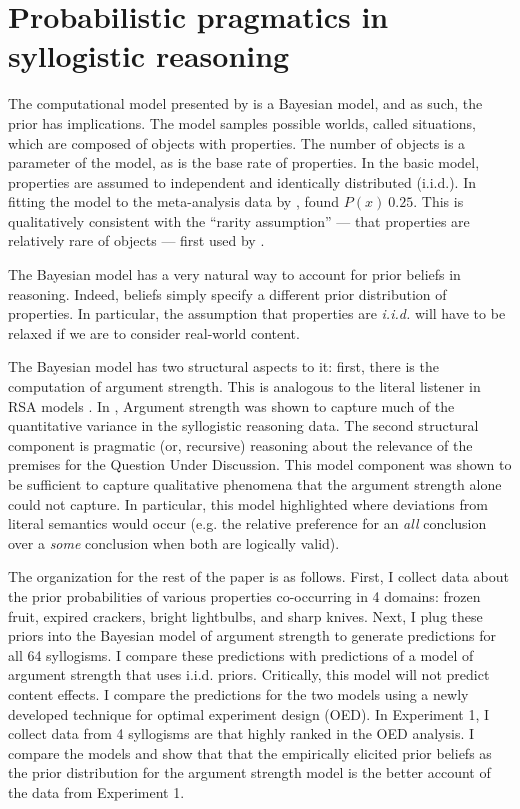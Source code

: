 \documentclass{llncs} %
\begin{document}
\section{Probabilistic pragmatics in syllogistic reasoning}

The computational model presented by  is a Bayesian model, and as such, the prior has implications. The model samples possible worlds, called situations, which are composed of objects with properties. The number of objects is a parameter of the model, as is the base rate of properties. In the basic model, properties are assumed to independent and identically distributed (i.i.d.). In fitting the model to the meta-analysis data by ,  found $P(x) ~ 0.25$. This is qualitatively consistent with the ``rarity assumption'' --- that properties are relatively rare of objects --- first used by .

The Bayesian model has a very natural way to account for prior beliefs in reasoning. Indeed, beliefs simply specify a different prior distribution of properties. In particular, the assumption that properties are \emph{i.i.d.} will have to be relaxed if we are to consider real-world content.

The Bayesian model has two structural aspects to it: first, there is the computation of argument strength. This is analogous to the literal listener in RSA models \cite{Frank2012; Goodman2013}. In \cite{Tessler2014}, Argument strength was shown to capture much of the quantitative variance in the syllogistic reasoning data. The second structural component is pragmatic (or, recursive) reasoning about the relevance of the premises for the Question Under Discussion. This model component was shown to be sufficient to capture qualitative phenomena that the argument strength alone could not capture. In particular, this model highlighted where deviations from literal semantics would occur (e.g. the relative preference for an \emph{all} conclusion over a \emph{some} conclusion when both are logically valid). 

The organization for the rest of the paper is as follows. First, I collect data about the prior probabilities of various properties co-occurring in 4 domains: frozen fruit, expired crackers, bright lightbulbs, and sharp knives. Next, I plug these priors into the Bayesian model of argument strength to generate predictions for all 64 syllogisms. I compare these predictions with predictions of a model of argument strength that uses i.i.d. priors. Critically, this model will not predict content effects. I compare the predictions for the two models using a newly developed technique for optimal experiment design (OED). In Experiment 1, I collect data from 4 syllogisms are that highly ranked in the OED analysis. I compare the models and show that that the empirically elicited prior beliefs as the prior distribution for the argument strength model is the better account of the data from Experiment 1. 
\end{document}
